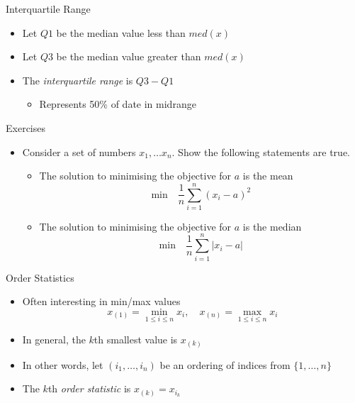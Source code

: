\documentclass{beamer}
\begin{document}
\begin{frame}{Interquartile Range} 
 \begin{itemize} 
  \item Let $Q1$ be the median value less than $med(x)$ 
  \item Let $Q3$ be the median value greater than $med(x)$
  \item The \emph{interquartile range} is $Q3 - Q1$ 
  \begin{itemize}
  \item Represents 50\% of date in midrange  
  \end{itemize} 
 \end{itemize}
\end{frame}

\begin{frame}{Exercises}  
\begin{itemize} 
 \item Consider a set of numbers $x_1, \ldots x_n$. Show the following statements are true. 
\begin{itemize} 
\item The solution to minimising the objective for $a$ is the mean 
\begin{displaymath} 
 \mbox{min} \quad  \frac{1}{n}\sum_{i=1}^n (x_i - a)^2
\end{displaymath}
\item The solution to minimising the objective for $a$ is the median 
\begin{displaymath} 
 \mbox{min} \quad  \frac{1}{n}\sum_{i=1}^n |x_i - a|
\end{displaymath}
\end{itemize}
 \end{itemize}
\end{frame}

\begin{frame}{Order Statistics}  
\begin{itemize} 
 \item Often interesting in min/max values 
 \begin{displaymath} 
  x_{(1)} = \min_{1 \leq i \leq n} x_i, \quad x_{(n)} = \max_{1 \leq i \leq n} x_i
 \end{displaymath}
\item In general, the $k$th smallest value is $x_{(k)}$ 
\item In other words, let $(i_1, \ldots, i_n)$ be an ordering of indices from $\{1, \ldots, n\}$ 
\item The $k$th \emph{order statistic} is $x_{(k)} = x_{i_k}$
\end{itemize}
\end{frame}
\end{document}
